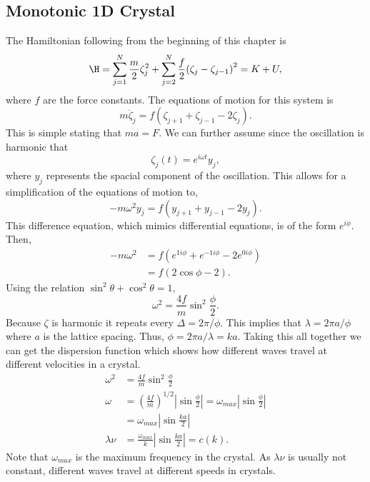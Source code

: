 \subsection{Monotonic 1D Crystal}
The Hamiltonian following from the beginning of this chapter is
\begin{equation*}
	\H = \sum_{j=1}^{N}{\frac{m}{2}\zeta_{j}^2} +  \sum_{j=2}^{N}{\frac{f}{2}
	{(\zeta_j - \zeta_{j-1})}^2} = K + U,
\end{equation*}
where $f$ are the force constants. The equations of motion for this system is
\begin{equation*}
	m\ddot{\zeta}_j = f(\zeta_{j+1} + \zeta_{j-1} - 2\zeta_{j}).
\end{equation*}
This is simple stating that $ma = F$. We can further assume since the
oscillation is harmonic that
\begin{equation*}
	\zeta_j (t) = e^{i\omega t} y_j,
\end{equation*}
where $y_j$ represents the spacial component of the oscillation. This allows
for a simplification of the equations of motion to,
\begin{equation*}
	-m \omega^2 y_j = f(y_{j+1} + y_{j-1} - 2y_{j}).
\end{equation*}
This difference equation, which mimics differential equations, is of the form
$e^{i\phi}$. Then,
\begin{align*}
	-m \omega^2 &= f(e^{1i \phi} + e^{-1i \phi} - 2 e^{0i \phi})\\
				&= f(2 \cos{\phi} - 2).
\end{align*}
Using the relation $\sin^2 \theta + \cos^2 \theta = 1 $,
\begin{equation*}
	\omega^2 = \frac{4f}{m} \sin^2{\frac{\phi}{2}}.
\end{equation*}
Because $\zeta$ is harmonic it repeats every $\Delta = 2\pi / \phi$. This
implies that $\lambda = 2\pi a / \phi$ where $a$ is the lattice spacing. Thus,
$\phi = 2\pi a / \lambda = ka$. Taking this all together we can get the
dispersion function which shows how different waves travel at different
velocities in a crystal.
\begin{align*}
	\omega^2 &= \frac{4f}{m} \sin^2{\frac{\phi}{2}}\\
	\omega &= {\left(\frac{4f}{m}\right)}^{1/2} | \sin{\frac{\phi}{2}} |
	= \omega_{max} | \sin{\frac{\phi}{2}} |\\
		   &= \omega_{max} | \sin{\frac{ka}{2}} |\\
	\lambda \nu &= \frac{\omega_{max}}{k}| \sin{\frac{ka}{2}} | = c(k).
\end{align*}
Note that $\omega_{max}$ is the maximum frequency in the crystal. As $\lambda
\nu$ is usually not constant, different waves travel at different speeds in
crystals.

